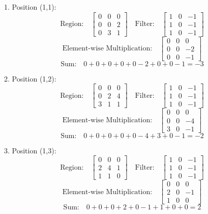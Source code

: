 \documentclass{article}
\begin{document}
1. Position (1,1):
\[
  \text{Region:} \quad \begin{bmatrix} 0 & 0 & 0 \\ 0 & 0 & 2 \\ 0 & 3 & 1 \end{bmatrix} \quad \text{Filter:} \quad \begin{bmatrix} 1 & 0 & -1 \\ 1 & 0 & -1 \\ 1 & 0 & -1 \end{bmatrix}
\]
\[
  \text{Element-wise Multiplication:} \quad \begin{bmatrix} 0 & 0 & 0 \\ 0 & 0 & -2 \\ 0 & 0 & -1 \end{bmatrix}
\]
\[
  \text{Sum:} \quad 0 + 0 + 0 + 0 + 0 - 2 + 0 + 0 - 1 = -3
\]

2. Position (1,2):
\[
  \text{Region:} \quad \begin{bmatrix} 0 & 0 & 0 \\ 0 & 2 & 4 \\ 3 & 1 & 1 \end{bmatrix} \quad \text{Filter:} \quad \begin{bmatrix} 1 & 0 & -1 \\ 1 & 0 & -1 \\ 1 & 0 & -1 \end{bmatrix}
\]
\[
  \text{Element-wise Multiplication:} \quad \begin{bmatrix} 0 & 0 & 0 \\ 0 & 0 & -4 \\ 3 & 0 & -1 \end{bmatrix}
\]
\[
  \text{Sum:} \quad 0 + 0 + 0 + 0 + 0 - 4 + 3 + 0 - 1 = -2
\]

3. Position (1,3):
\[
  \text{Region:} \quad \begin{bmatrix} 0 & 0 & 0 \\ 2 & 4 & 1 \\ 1 & 1 & 0 \end{bmatrix} \quad \text{Filter:} \quad \begin{bmatrix} 1 & 0 & -1 \\ 1 & 0 & -1 \\ 1 & 0 & -1 \end{bmatrix}
\]
\[
  \text{Element-wise Multiplication:} \quad \begin{bmatrix} 0 & 0 & 0 \\ 2 & 0 & -1 \\ 1 & 0 & 0 \end{bmatrix}
\]
\[
  \text{Sum:} \quad 0 + 0 + 0 + 2 + 0 - 1 + 1 + 0 + 0 = 2
\]
\end{document}
